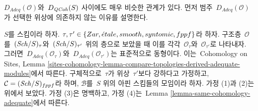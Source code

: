 \medskip\noindent
$D_{\textit{Adeq}}(\mathcal{O})$와\  $D_{\mathit{QCoh}}(S)$ 사이에도 매우 비슷한
관계가 있다. 먼저 범주\  $D_{\textit{Adeq}}(\mathcal{O})$가 선택한
위상에 의존하지 않는 이유를 설명한다.

\begin{remark}
\label{remark-D-adeq-independence-topology}
$S$를 스킴이라 하자.
$\tau, \tau' \in \{Zar, {\acute{e}tale}, smooth, syntomic, fppf\}$라 하자.
구조층\ $\mathcal{O}$를\  $(\mathit{Sch}/S)_\tau$와\  $(\mathit{Sch}/S)_{\tau'}$ 위의
층으로 보았을 때 이를 각각\  $\mathcal{O}_\tau$와\ $\mathcal{O}_{\tau'}$로
나타내자. 그러면\ 
$D_{\textit{Adeq}}(\mathcal{O}_\tau)$와\ 
$D_{\textit{Adeq}}(\mathcal{O}_{\tau'})$는 표준적으로 동형이다.
이는\  Cohomology on Sites, Lemma
\ref{sites-cohomology-lemma-compare-topologies-derived-adequate-modules}에서
따른다. 구체적으로\  $\tau$가 위상\  $\tau'$보다 강하다고 가정하고,
$\mathcal{C} = (\mathit{Sch}/S)_{fppf}$라 하며, $\mathcal{B}$를\  $S$ 위의
아핀 스킴들의 모임이라 하자. 가정 (1)과 (2)는 위에서 보았다.
가정 (3)은 명백하고, 가정 (4)는\  Lemma
\ref{lemma-same-cohomology-adequate}에서 따른다.
\end{remark}

